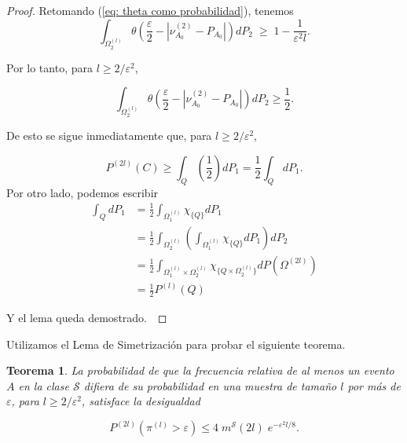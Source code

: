 \documentclass{report}
\newtheorem{thm}{Teorema}[section]
\begin{document}
\begin{proof}
Retomando (\ref{eq: theta como probabilidad}), tenemos
\[
    \int_{ \Omega_2^{(l)}}  \theta\left(\frac{\varepsilon}{2} - |\nu^{(2)}_{A_0}-P_{A_0}|\right) dP_2 \;\geq\; 1 - \frac{1}{\varepsilon^2 l}.
    \]

Por lo tanto, para \( l \geq 2 / \varepsilon^2 \),

\[
\int_{\Omega_2^{(l)}} \theta \left( \frac{\varepsilon}{2} - \left| \nu^{(2)}_{A_0} - P_{A_0} \right| \right) dP_2 \geq \frac{1}{2}.
\]

De esto se sigue inmediatamente que, para \( l \geq 2 / \varepsilon^2 \),

\[
P^{(2l)}(C) \geq \int_{Q} \left( \frac{1}{2} \right) dP_1  =
 \frac{1}{2} \int_{Q} dP_1.
\]
Por otro lado, podemos escribir
\begin{equation*}
 \begin{split}
   \int_{Q}dP_1 & = \frac{1}{2} \int_{\Omega_1^{(l)}} \chi_{\{Q\}}dP_1 \\
   &=\frac{1}{2}  \int_{\Omega_2^{(l)}}\left(\int_{\Omega_1^{(l)}} \chi_{\{Q\}}dP_1\right) dP_2 \\
   &=\frac{1}{2}  \int_{\Omega_1^{(l)}\times\Omega_2^{(l)}}  \chi_{\{Q\times \Omega_2^{(l)}\}} dP(\Omega^{(2l)}) \\
   &=\frac{1}{2}  P^{(l)}(Q)
\end{split}
\end{equation*}

Y el lema queda demostrado.\



\end{proof}







Utilizamos el Lema de Simetrización para probar el siguiente teorema.

\begin{thm}
    La probabilidad de que la frecuencia relativa de al menos un evento $A$ en la clase \( \mathcal{S} \) difiera de su probabilidad en una
    muestra de tamaño \( l \) por más de \( \varepsilon \), para \( l \geq 2 / \varepsilon^2 \), satisface la desigualdad

    \[
    P^{(2l)}\left(\pi^{(l)} > \varepsilon\right) \leq 4 \; m^{\mathcal{S}}(2l) \; e^{-\varepsilon^2 l/8}.
    \]
\end{thm}
\end{document}
